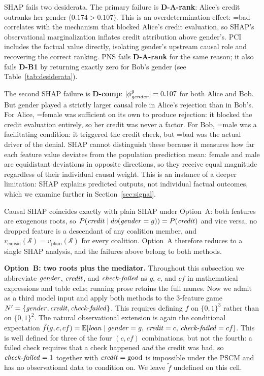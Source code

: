 SHAP fails two desiderata. The primary failure is \textbf{D-A-rank}: Alice's
credit outranks her gender ($0.174 > 0.107$). This is an overdetermination
effect: =bad correlates with the 
mechanism that blocked Alice's credit evaluation, so SHAP's observational
marginalization inflates credit attribution above gender's. PCI includes the factual
 value directly, isolating gender's upstream causal
role and recovering the correct ranking. PNS fails \textbf{D-A-rank} for the same reason;
it also fails \textbf{D-B1} by returning exactly zero for Bob's gender (see
Table~\ref{tab:desiderata}).

The second SHAP failure is \textbf{D-comp}: $|\phi^g_{\varname{gender}}|=0.107$
for both Alice and Bob. But gender played a strictly larger causal role in Alice's
rejection than in Bob's. For Alice, =female was sufficient on its
own to produce rejection: it blocked the credit evaluation entirely, so her
credit was never a factor. For Bob, =male was a facilitating
condition: it triggered the credit check, but =bad was the actual
driver of the denial. SHAP cannot distinguish these because it measures how far
each feature value deviates from the population prediction mean: female and
male are equidistant deviations in opposite directions, so they receive equal
magnitude regardless of their individual causal weight. This is an instance of a
deeper limitation: SHAP explains predicted outputs, not individual factual
outcomes, which we examine further in Section~\ref{sec:signal}.

Causal SHAP coincides exactly with plain SHAP under Option~A: both features
are exogenous roots, so
$P(\varname{credit}\mid do(\varname{gender}=g))=P(\varname{credit})$ and vice
versa, no dropped feature is a descendant of any coalition member, and
$v_{\mathrm{causal}}(\mathcal{S})=v_{\mathrm{plain}}(\mathcal{S})$ for every coalition. Option~A
therefore reduces to a single SHAP analysis, and the failures
above belong to both methods.

\medskip\noindent\textbf{Option~B: two roots plus the mediator.}
Throughout this subsection we abbreviate $\varname{gender}$, $\varname{credit}$, and
$\varname{check\text{-}failed}$ as $g$, $c$, and $cf$ in mathematical expressions and table
cells; running prose retains the full names.
Now we admit  as a third model input and apply
both methods to the 3-feature game $N'=\{\varname{gender},\varname{credit},\varname{check\text{-}failed}\}$.
This requires defining $f$ on $\{0,1\}^3$ rather than on $\{0,1\}^2$. The
natural observational extension is again the conditional expectation
$\tilde f(g,c,cf)=\mathbb{E}[\varname{loan}\mid \varname{gender}=g,\,\varname{credit}=c,\,\varname{check\text{-}failed}=cf]$.
This is well defined for three of the four $(c,cf)$ combinations, but not the
fourth: a failed check requires that a check happened \emph{and} the credit
was bad, so $\varname{check\text{-}failed}=1$ together with
$\varname{credit}=\text{good}$ is impossible under the PSCM and has no
observational data to condition on. We leave $\tilde f$ undefined on this cell.

